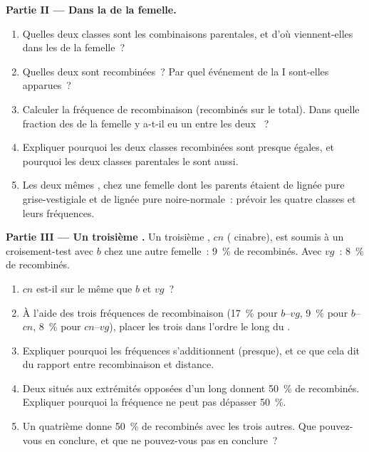 \begin{problem}
\medskip
\noindent\textbf{Partie II --- Dans la  de la femelle.}
\begin{enumerate}[resume]
  \item Quelles deux classes sont les combinaisons parentales, et d'où
        viennent-elles dans les  de la femelle~?
  \item Quelles deux sont recombinées~? Par quel événement de la 
        I sont-elles apparues~?
  \item Calculer la fréquence de recombinaison (recombinés sur le
        total). Dans quelle fraction des  de la femelle y
        a-t-il eu un  entre les deux ~?
  \item Expliquer pourquoi les deux classes recombinées sont presque
        égales, et pourquoi les deux classes parentales le sont aussi.
  \item Les deux mêmes , chez une femelle dont les parents étaient
        de lignée pure grise-vestigiale et de lignée pure
        noire-normale~: prévoir les quatre classes et leurs fréquences.
\end{enumerate}

\medskip
\noindent\textbf{Partie III --- Un troisième .}
Un troisième , $cn$ ( cinabre), est soumis à un
croisement-test avec $b$ chez une autre femelle~: 9~\% de recombinés.
Avec $vg$~: 8~\% de recombinés.
\begin{enumerate}[resume]
  \item $cn$ est-il sur le même  que $b$ et $vg$~?
  \item À l'aide des trois fréquences de recombinaison (17~\% pour
        $b$--$vg$, 9~\% pour $b$--$cn$, 8~\% pour $cn$--$vg$), placer
        les trois  dans l'ordre le long du .
  \item Expliquer pourquoi les fréquences s'additionnent (presque), et
        ce que cela dit du rapport entre recombinaison et distance.
  \item Deux  situés aux extrémités opposées d'un long 
        donnent 50~\% de recombinés. Expliquer pourquoi la fréquence ne
        peut pas dépasser 50~\%.
  \item Un quatrième  donne 50~\% de recombinés avec les trois
        autres. Que pouvez-vous en conclure, et que ne pouvez-vous pas
        en conclure~?
\end{enumerate}


\end{problem}
